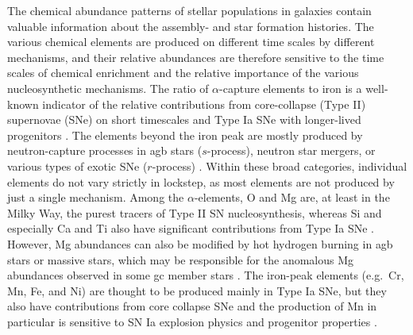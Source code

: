 \documentclass{aa}
\begin{document}
The chemical abundance patterns of stellar populations in galaxies contain valuable information about the assembly- and star formation histories.
The various chemical elements are produced on different time scales by different mechanisms, and their relative abundances are therefore sensitive to the time scales of chemical enrichment and the relative importance of the various nucleosynthetic mechanisms. The ratio of $\alpha$-capture elements to iron is a well-known indicator of the relative contributions from  core-collapse (Type II) supernovae (SNe) on short timescales and Type Ia SNe with longer-lived progenitors \citep{Tinsley1979,Matteucci1986}. The elements beyond the iron peak are mostly produced by neutron-capture processes in \ac{agb} stars ($s$-process), neutron star mergers, or various types of exotic SNe ($r$-process) \citep{Burbidge1957,Kobayashi2020}. Within these broad categories, individual elements do not vary strictly in lockstep, as most elements are not produced by just a single mechanism. Among the $\alpha$-elements, O and Mg are, at least in the Milky Way, the purest tracers of Type II SN nucleosynthesis, whereas Si and especially Ca and Ti also have significant contributions from Type Ia SNe \citep{Kobayashi2020}. However, Mg abundances can  also be modified by hot hydrogen burning in \ac{agb} stars or massive stars, which may be responsible for the anomalous Mg abundances observed in some \ac{gc} member stars \citep{Gratton2012,Bastian2018}. The iron-peak elements (e.g.\ Cr, Mn, Fe, and Ni) are thought to be produced mainly in Type Ia SNe, but they also have contributions from core collapse SNe \citep{Kobayashi2020} and the production of Mn in particular is sensitive to SN Ia explosion physics and progenitor properties \citep{McWilliam2003,Kirby2019,Eitner2020,Sanders2021}. 
\end{document}
